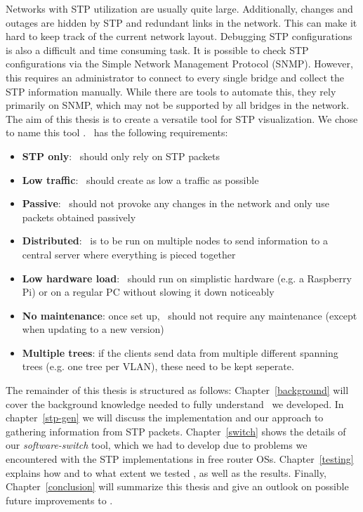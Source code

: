 Networks with STP utilization are usually quite large.
Additionally, changes and outages are hidden by STP and redundant links in the network.
This can make it hard to keep track of the current network layout.
Debugging STP configurations is also a difficult and time consuming task.
It is possible to check STP configurations via the Simple Network Management Protocol (SNMP).
However, this requires an administrator to connect to every single bridge and collect the STP information manually.
While there are tools to automate this, they rely primarily on SNMP, which may not be supported by all bridges in the network.\\

The aim of this thesis is to create a versatile tool for STP visualization.
We chose to name this tool \textit{\tool}.
\tool\ has the following requirements:
\begin{itemize}
    \item \textbf{STP only}: \tool\ should only rely on STP packets
    \item \textbf{Low traffic}: \tool\ should create as low a traffic as possible
    \item \textbf{Passive}: \tool\ should not provoke any changes in the network and only use packets obtained passively
    \item \textbf{Distributed}: \tool\ is to be run on multiple nodes to send information to a central server where everything is pieced together
    \item \textbf{Low hardware load}: \tool\ should run on simplistic hardware (e.g. a Raspberry Pi) or on a regular PC without slowing it down noticeably
    \item \textbf{No maintenance}: once set up, \tool\ should not require any maintenance (except when updating to a new version)
    \item \textbf{Multiple trees}: if the clients send data from multiple different spanning trees (e.g. one tree per VLAN), these need to be kept seperate.
    \label{requirements}
\end{itemize}

The remainder of this thesis is structured as follows: %
Chapter~\ref{background} will cover the background knowledge needed to fully understand \tool\ we developed.
In chapter~\ref{stp-gen} we will discuss the implementation and our approach to gathering information from STP packets.
Chapter~\ref{switch} shows the details of our \textit{software-switch} tool, which we had to develop due to problems we encountered with the STP implementations in free router OSs\cite{OpenWrt}\cite{dd-wrt}.
Chapter~\ref{testing} explains how and to what extent we tested \tool, as well as the results.
Finally, Chapter~\ref{conclusion} will summarize this thesis and give an outlook on possible future improvements to \tool.
